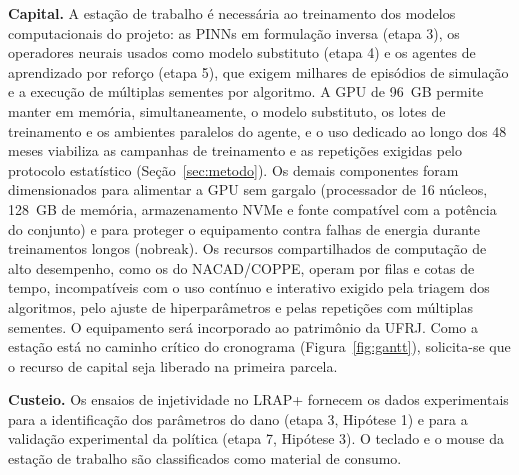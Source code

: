 \documentclass[10pt,a4paper]{article}
\begin{document}
\textbf{Capital.} A estação de trabalho é necessária ao treinamento dos modelos
computacionais do projeto: as PINNs em formulação inversa (etapa 3), os operadores neurais
usados como modelo substituto (etapa 4) e os agentes de aprendizado por reforço (etapa 5),
que exigem milhares de episódios de simulação e a execução de múltiplas sementes por
algoritmo. A GPU de 96~GB permite manter em memória, simultaneamente, o modelo substituto, os
lotes de treinamento e os ambientes paralelos do agente, e o uso dedicado ao longo dos
48 meses viabiliza as campanhas de treinamento e as repetições exigidas pelo protocolo
estatístico (Seção~\ref{sec:metodo}). Os demais componentes foram dimensionados para
alimentar a GPU sem gargalo (processador de 16 núcleos, 128~GB de memória, armazenamento
NVMe e fonte compatível com a potência do conjunto) e para proteger o equipamento contra
falhas de energia durante treinamentos longos (nobreak). Os recursos compartilhados de computação
de alto desempenho, como os do NACAD/COPPE, operam por filas e cotas de tempo, incompatíveis com o
uso contínuo e interativo exigido pela triagem dos algoritmos, pelo ajuste de hiperparâmetros e
pelas repetições com múltiplas sementes. O equipamento será incorporado ao patrimônio da UFRJ.
Como a estação está no caminho crítico do cronograma (Figura~\ref{fig:gantt}), solicita-se que o
recurso de capital seja liberado na primeira parcela.

\textbf{Custeio.} Os ensaios de injetividade no LRAP+ fornecem os dados experimentais para
a identificação dos parâmetros do dano (etapa 3, Hipótese 1) e para a validação
experimental da política (etapa 7, Hipótese 3). O teclado e o mouse da estação de trabalho
são classificados como material de consumo.
\end{document}
